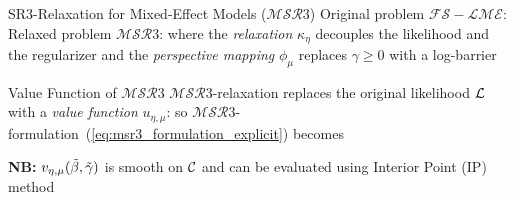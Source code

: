 \documentclass[8pt]{beamer}
\newcommand{\ouralgo}{\ensuremath{\mathcal{MSR}3}}
\begin{document}
\begin{frame}{SR3-Relaxation for Mixed-Effect Models ($\ouralgo$)}
Original problem $\mathcal{FS-LME}$:
Relaxed problem $\ouralgo$:
where the \textit{relaxation} $\kappa_\eta$ decouples the likelihood and the regularizer 
and the \textit{perspective mapping} $\phi_\mu$ replaces $\gamma \geq 0$ with a log-barrier 
\end{frame}

\begin{frame}{Value Function of $\mathcal{MSR}3$}
$\ouralgo$-relaxation replaces the original likelihood $\operatorname{\mathcal{L}}$ with a \textit{value function} $u_{\eta,\mu}$:
so $\ouralgo$-formulation~(\ref{eq:msr3_formulation_explicit}) becomes

\textbf{NB:} $v_{\eta,\mu}(\tilde\beta, \tilde\gamma)$ is smooth on $\mathcal{C}$ and can be evaluated using Interior Point (IP) method


\end{frame}
\end{document}
